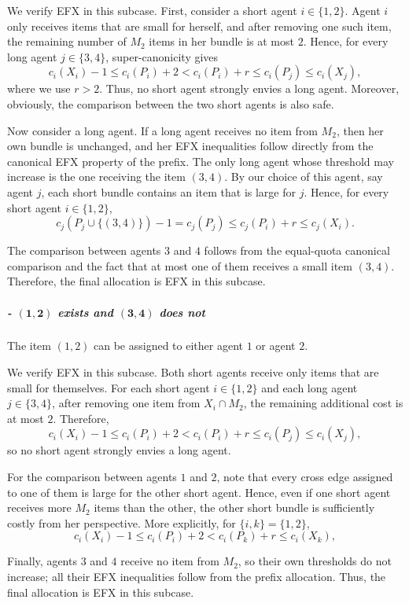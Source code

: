 \documentclass{article}
\theoremstyle{definition}
\begin{document}
We verify EFX in this subcase.  First, consider a short agent
$i\in\{1,2\}$.  Agent $i$ only receives items that are small for herself, and
after removing one such item, the remaining number of $M_2$ items in her
bundle is at most $2$.  Hence, for every long agent $j\in\{3,4\}$,
super-canonicity gives
\[
    c_i(X_i)-1
    \le c_i(P_i)+2
    < c_i(P_i)+r
    \le c_i(P_j)
    \le c_i(X_j),
\]
where we use $r>2$.  Thus, no short agent strongly envies a long agent. Moreover, obviously, the comparison between the two short agents is also safe.

Now consider a long agent.  If a long agent receives no item from $M_2$, then
her own bundle is unchanged, and her EFX inequalities follow directly from
the canonical EFX property of the prefix.  The only long agent whose threshold
may increase is the one receiving the item $(3,4)$.  By our choice of this
agent, say agent $j$, each short bundle contains an item that is large for
$j$.  Hence, for every short agent $i\in\{1,2\}$,
\[
    c_j(P_j\cup\{(3,4)\})-1
    =c_j(P_j)
    \le c_j(P_i)+r
    \le c_j(X_i).
\]

The comparison between agents $3$ and $4$ follows from the equal-quota
canonical comparison and the fact that at most one of them receives a small
item $(3,4)$.  Therefore, the final allocation is EFX in this subcase.

\subparagraph{- $\boldsymbol{(1,2)}$ exists and $\boldsymbol{(3,4)}$ does not}The item $(1,2)$ can be assigned to
either agent $1$ or agent $2$.

We verify EFX in this subcase.  Both short agents receive only items that are
small for themselves.  For each short agent $i\in\{1,2\}$ and each long agent
$j\in\{3,4\}$, after removing one item from $X_i\cap M_2$, the remaining
additional cost is at most $2$.  Therefore,
\[
    c_i(X_i)-1
    \le c_i(P_i)+2
    < c_i(P_i)+r
    \le c_i(P_j)
    \le c_i(X_j),
\]
so no short agent strongly envies a long agent.

For the comparison between agents $1$ and $2$, note that every cross edge
assigned to one of them is large for the other short agent.  Hence, even if
one short agent receives more $M_2$ items than the other, the other short
bundle is sufficiently costly from her perspective.  More explicitly, for
$\{i,k\}=\{1,2\}$,
\[
    c_i(X_i)-1
    \le c_i(P_i) + 2 < c_i(P_k) + r \le c_i(X_k),
\]

Finally, agents $3$ and $4$ receive no item from $M_2$, so their own thresholds do not increase; all their EFX inequalities follow from the prefix allocation.  Thus,
the final allocation is EFX in this subcase.
\end{document}

